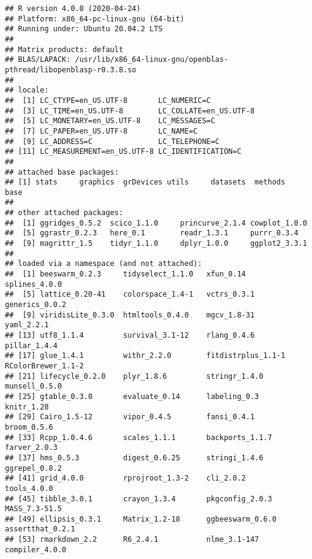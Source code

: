 \documentclass[
]{article}
\begin{document}
\begin{verbatim}
## R version 4.0.0 (2020-04-24)
## Platform: x86_64-pc-linux-gnu (64-bit)
## Running under: Ubuntu 20.04.2 LTS
## 
## Matrix products: default
## BLAS/LAPACK: /usr/lib/x86_64-linux-gnu/openblas-pthread/libopenblasp-r0.3.8.so
## 
## locale:
##  [1] LC_CTYPE=en_US.UTF-8       LC_NUMERIC=C              
##  [3] LC_TIME=en_US.UTF-8        LC_COLLATE=en_US.UTF-8    
##  [5] LC_MONETARY=en_US.UTF-8    LC_MESSAGES=C             
##  [7] LC_PAPER=en_US.UTF-8       LC_NAME=C                 
##  [9] LC_ADDRESS=C               LC_TELEPHONE=C            
## [11] LC_MEASUREMENT=en_US.UTF-8 LC_IDENTIFICATION=C       
## 
## attached base packages:
## [1] stats     graphics  grDevices utils     datasets  methods   base     
## 
## other attached packages:
##  [1] ggridges_0.5.2  scico_1.1.0     princurve_2.1.4 cowplot_1.0.0  
##  [5] ggrastr_0.2.3   here_0.1        readr_1.3.1     purrr_0.3.4    
##  [9] magrittr_1.5    tidyr_1.1.0     dplyr_1.0.0     ggplot2_3.3.1  
## 
## loaded via a namespace (and not attached):
##  [1] beeswarm_0.2.3     tidyselect_1.1.0   xfun_0.14          splines_4.0.0     
##  [5] lattice_0.20-41    colorspace_1.4-1   vctrs_0.3.1        generics_0.0.2    
##  [9] viridisLite_0.3.0  htmltools_0.4.0    mgcv_1.8-31        yaml_2.2.1        
## [13] utf8_1.1.4         survival_3.1-12    rlang_0.4.6        pillar_1.4.4      
## [17] glue_1.4.1         withr_2.2.0        fitdistrplus_1.1-1 RColorBrewer_1.1-2
## [21] lifecycle_0.2.0    plyr_1.8.6         stringr_1.4.0      munsell_0.5.0     
## [25] gtable_0.3.0       evaluate_0.14      labeling_0.3       knitr_1.28        
## [29] Cairo_1.5-12       vipor_0.4.5        fansi_0.4.1        broom_0.5.6       
## [33] Rcpp_1.0.4.6       scales_1.1.1       backports_1.1.7    farver_2.0.3      
## [37] hms_0.5.3          digest_0.6.25      stringi_1.4.6      ggrepel_0.8.2     
## [41] grid_4.0.0         rprojroot_1.3-2    cli_2.0.2          tools_4.0.0       
## [45] tibble_3.0.1       crayon_1.3.4       pkgconfig_2.0.3    MASS_7.3-51.5     
## [49] ellipsis_0.3.1     Matrix_1.2-18      ggbeeswarm_0.6.0   assertthat_0.2.1  
## [53] rmarkdown_2.2      R6_2.4.1           nlme_3.1-147       compiler_4.0.0
\end{verbatim}
\end{document}
